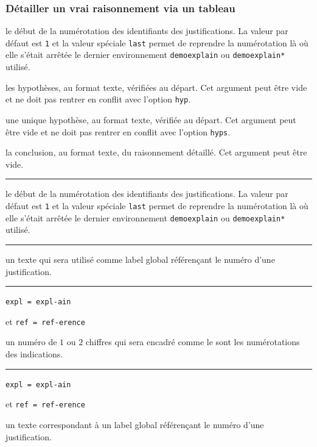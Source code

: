 \documentclass[12pt,a4paper]{book}
\newcommand\env[1]{\texttt{#1}}
\theoremstyle{definition}
\newcommand\separation{
	\medskip
	\hfill\rule{0.5\textwidth}{0.75pt}\hfill
	\medskip
}
\newcommand\mwhyprefix[2]{%
	\texttt{#1 = #1-#2}%
}
\begin{document}
{{\subsubsection{Détailler un \og vrai \fg{} raisonnement via un tableau}


 le début de la numérotation des identifiants des justifications.
              La valeur par défaut est \verb+1+ et la valeur spéciale \verb+last+ permet de reprendre la numérotation là où elle s'était arrêtée le dernier environnement \env{demoexplain} ou \env{demoexplain*} utilisé.

 les hypothèses, au format texte, vérifiées au départ.
              Cet argument peut être vide et ne doit pas rentrer en conflit avec l'option \verb+hyp+.

 une unique hypothèse, au format texte, vérifiée au départ.
              Cet argument peut être vide et ne doit pas rentrer en conflit avec l'option \verb+hyps+.

 la conclusion, au format texte, du raisonnement détaillé.
              Cet argument peut être vide.


\separation



 le début de la numérotation des identifiants des justifications.
              La valeur par défaut est \verb+1+ et la valeur spéciale \verb+last+ permet de reprendre la numérotation là où elle s'était arrêtée le dernier environnement \env{demoexplain} ou \env{demoexplain*} utilisé.


\separation



\IDoption{} un texte qui sera utilisé comme label global référençant le numéro d'une justification.


\separation


  \hfill \mwhyprefix{expl}{ain}
                             et \mwhyprefix{ref}{erence}

\IDarg{} un numéro de $1$ ou $2$ chiffres qui sera encadré comme le sont les numérotations des indications.


\separation


  \hfill \mwhyprefix{expl}{ain}
                              et \mwhyprefix{ref}{erence}

\IDarg{} un texte correspondant à un label global référençant le numéro d'une justification.


}}
\end{document}
